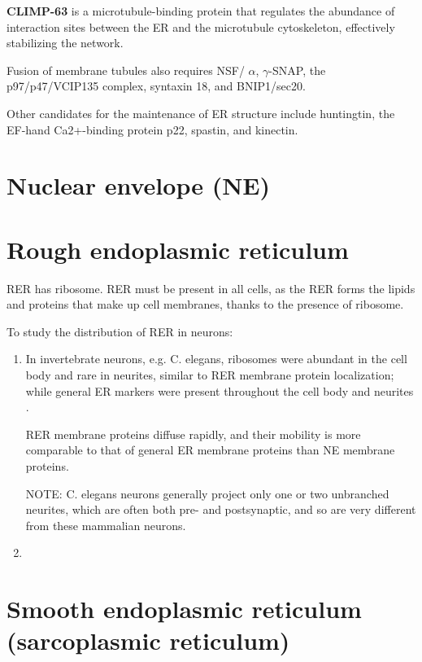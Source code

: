 {\bf CLIMP-63} is a microtubule-binding protein that regulates
the abundance of interaction sites between the ER and the
microtubule cytoskeleton, effectively stabilizing the network.

Fusion of membrane tubules also requires NSF/ $\alpha$, $\gamma$-SNAP, the
p97/p47/VCIP135 complex, syntaxin 18, and BNIP1/sec20.

Other candidates for the maintenance of ER structure include huntingtin, the
EF-hand Ca2+-binding protein p22, spastin, and kinectin.


\section{Nuclear envelope (NE)}
\label{sec:nuclear-envelope}



\section{Rough endoplasmic reticulum}
\label{sec:rough-ER}

RER has ribosome.
RER must be present in all cells, as the RER forms the lipids and proteins that
make up cell membranes, thanks to the presence of ribosome.

To study the distribution of RER in neurons:
\begin{enumerate}
  \item  In invertebrate neurons, e.g. C. elegans, ribosomes were abundant in
  the cell body and rare in neurites, similar to RER membrane protein
  localization; while general ER markers were present throughout the cell body
  and neurites \citep{rolls2002}.  

RER membrane proteins diffuse rapidly, and their mobility is more comparable to
that of general ER membrane proteins than NE membrane proteins.

NOTE: C. elegans neurons generally project only one or two unbranched neurites,
which are often both pre- and postsynaptic, and so are very different from these
mammalian neurons.

  \item  
\end{enumerate}


\section{Smooth endoplasmic reticulum (sarcoplasmic reticulum)}
\label{sec:smooth-ER}
\label{sec:sarcoplasmic-reticulum}

